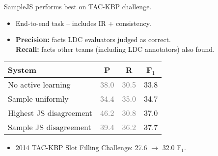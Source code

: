 \def\g#1{\textcolor{gray}{#1}}
\begin{frame}[noframenumbering]{SampleJS performs best on TAC-KBP challenge.}
\begin{itemize}
  \item End-to-end task -- includes IR + consistency.
  \pause
\item \textbf{Precision:} facts LDC evaluators judged as correct. \\
      \textbf{Recall:} facts other teams (including LDC annotators) also found.
\end{itemize}
\pause
\vspace{0.25cm}

\begin{center}
  \begin{tabular}{lccc}
    \textbf{System} & \textbf{P} & \textbf{R} & \textbf{F$_1$} \\
    \hline
    No active learning                 & \g{38.0} & \g{30.5} & 33.8 \pause \\
    \hline
    Sample uniformly                   & \g{34.4}              & \g{35.0}          & 34.7 \pause \\
    Highest JS disagreement            & \g{46.2} & \g{30.8}          & 37.0 \pause \\
    Sample JS disagreement             & \g{39.4}              & \g{36.2}          & 37.7 \\
  \end{tabular}
\end{center}
\pause
\begin{itemize}
  \item 2014 TAC-KBP Slot Filling Challenge: 27.6 $\rightarrow$ 32.0 F$_1$.
\end{itemize}
\end{frame}

